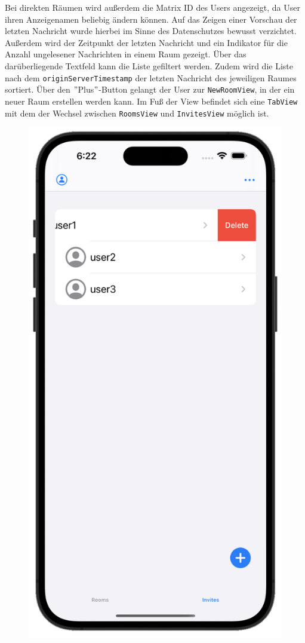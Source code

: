    Bei direkten Räumen wird außerdem die Matrix ID des Users angezeigt, da User ihren Anzeigenamen beliebig ändern können.
    Auf das Zeigen einer Vorschau der letzten Nachricht wurde hierbei im Sinne des Datenschutzes bewusst verzichtet.
    Außerdem wird der Zeitpunkt der letzten Nachricht und ein Indikator für die Anzahl ungelesener Nachrichten in einem Raum gezeigt.
    Über das darüberliegende Textfeld kann die Liste gefiltert werden.
    Zudem wird die Liste nach dem \texttt{originServerTimestamp} der letzten Nachricht des jeweiligen Raumes sortiert.
    Über den \("\)Plus\("\)-Button gelangt der User zur \texttt{NewRoomView}, in der ein neuer Raum erstellen werden kann.
    Im Fuß der View befindet sich eine \texttt{TabView} mit dem der Wechsel zwischen \texttt{RoomsView} und \texttt{InvitesView} möglich ist.
    \begin{figure}[h]
        \includegraphics[scale=0.5]{invites_white}

\end{figure}
